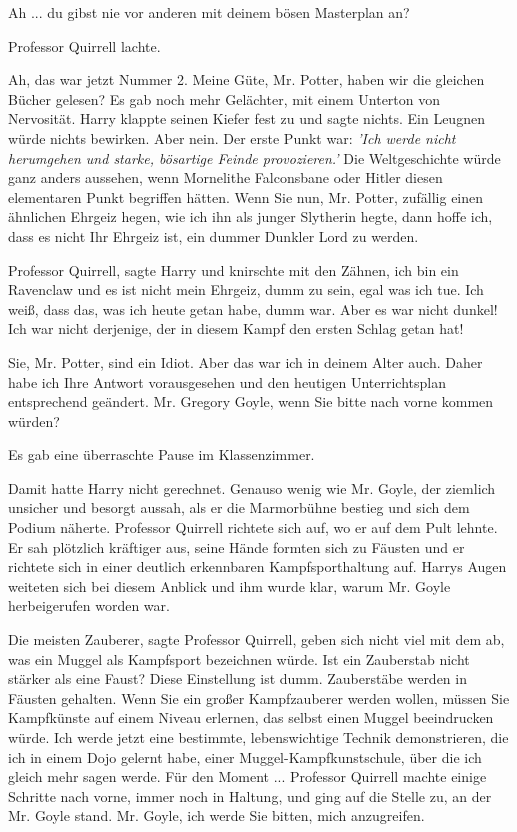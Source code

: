 \glqq{}Ah ... du gibst nie vor anderen mit deinem bösen Masterplan an?\grqq{}

Professor Quirrell lachte.

\glqq{}Ah, das war jetzt Nummer 2. Meine Güte, Mr. Potter, haben wir die gleichen
Bücher gelesen?\grqq{} Es gab noch mehr Gelächter, mit einem Unterton von
Nervosität. Harry klappte seinen Kiefer fest zu und sagte nichts. Ein Leugnen
würde nichts bewirken. \glqq{}Aber nein. Der erste Punkt war: \emph{'Ich werde
nicht herumgehen und starke, bösartige Feinde provozieren.'} Die Weltgeschichte
würde ganz anders aussehen, wenn Mornelithe Falconsbane oder Hitler diesen
elementaren Punkt begriffen hätten. Wenn Sie nun, Mr. Potter, zufällig einen
ähnlichen Ehrgeiz hegen, wie ich ihn als junger Slytherin hegte, dann hoffe ich,
dass es nicht Ihr Ehrgeiz ist, ein dummer Dunkler Lord zu werden.\grqq{}

\glqq{}Professor Quirrell\grqq{}, sagte Harry und knirschte mit den Zähnen, \glqq{}
ich bin ein Ravenclaw und es ist nicht mein Ehrgeiz, dumm zu sein, egal was ich
tue. Ich weiß, dass das, was ich heute getan habe, dumm war. Aber es war nicht
dunkel! Ich war nicht derjenige, der in diesem Kampf den ersten Schlag getan
hat!\grqq{}

\glqq{}Sie, Mr. Potter, sind ein Idiot. Aber das war ich in deinem Alter auch.
Daher habe ich Ihre Antwort vorausgesehen und den heutigen Unterrichtsplan
entsprechend geändert. Mr. Gregory Goyle, wenn Sie bitte nach vorne kommen
würden?\grqq{}

Es gab eine überraschte Pause im Klassenzimmer.

Damit hatte Harry nicht gerechnet. Genauso wenig wie Mr. Goyle, der ziemlich
unsicher und besorgt aussah, als er die Marmorbühne bestieg und sich dem Podium
näherte. Professor Quirrell richtete sich auf, wo er auf dem Pult lehnte. Er sah
plötzlich kräftiger aus, seine Hände formten sich zu Fäusten und er richtete
sich in einer deutlich erkennbaren Kampfsporthaltung auf. Harrys Augen weiteten
sich bei diesem Anblick und ihm wurde klar, warum Mr. Goyle herbeigerufen worden
war.

\glqq{}Die meisten Zauberer\grqq{}, sagte Professor Quirrell, \glqq{}geben sich
nicht viel mit dem ab, was ein Muggel als Kampfsport bezeichnen würde. Ist ein
Zauberstab nicht stärker als eine Faust? Diese Einstellung ist dumm. Zauberstäbe
werden in Fäusten gehalten. Wenn Sie ein großer Kampfzauberer werden wollen,
müssen Sie Kampfkünste auf einem Niveau erlernen, das selbst einen Muggel
beeindrucken würde. Ich werde jetzt eine bestimmte, lebenswichtige Technik
demonstrieren, die ich in einem Dojo gelernt habe, einer
Muggel-Kampfkunstschule, über die ich gleich mehr sagen werde. Für den
Moment ...\grqq{} Professor Quirrell machte einige Schritte nach vorne, immer
noch in Haltung, und ging auf die Stelle zu, an der Mr. Goyle stand. \glqq{}Mr.
Goyle, ich werde Sie bitten, mich anzugreifen.\grqq{}

